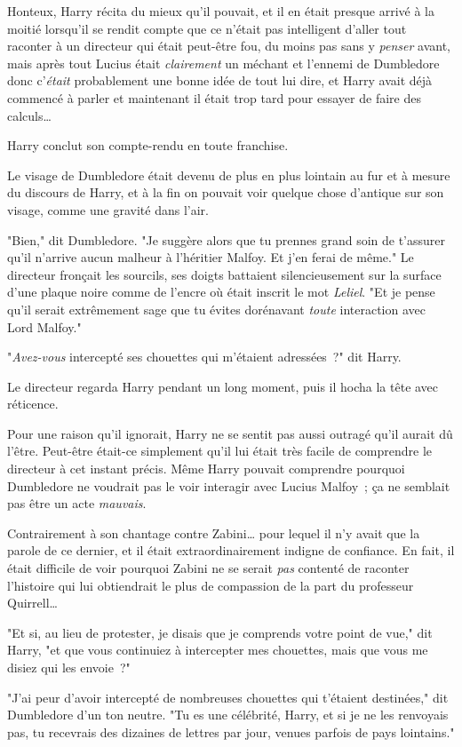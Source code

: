 Honteux, Harry récita du mieux qu'il pouvait, et il en était presque arrivé à la moitié lorsqu'il se rendit compte que ce n'était pas intelligent d'aller tout raconter à un directeur qui était peut-être fou, du moins pas sans y \emph{penser} avant, mais après tout Lucius était \emph{clairement} un méchant et l'ennemi de Dumbledore donc c'\emph{était} probablement une bonne idée de tout lui dire, et Harry avait déjà commencé à parler et maintenant il était trop tard pour essayer de faire des calculs…

Harry conclut son compte-rendu en toute franchise.

Le visage de Dumbledore était devenu de plus en plus lointain au fur et à mesure du discours de Harry, et à la fin on pouvait voir quelque chose d'antique sur son visage, comme une gravité dans l'air.

"Bien," dit Dumbledore. "Je suggère alors que tu prennes grand soin de t'assurer qu'il n'arrive aucun malheur à l'héritier Malfoy. Et j'en ferai de même." Le directeur fronçait les sourcils, ses doigts battaient silencieusement sur la surface d'une plaque noire comme de l'encre où était inscrit le mot \emph{Leliel}. "Et je pense qu'il serait extrêmement sage que tu évites dorénavant \emph{toute} interaction avec Lord Malfoy."

"\emph{Avez-vous} intercepté ses chouettes qui m'étaient adressées~?" dit Harry.

Le directeur regarda Harry pendant un long moment, puis il hocha la tête avec réticence.

Pour une raison qu'il ignorait, Harry ne se sentit pas aussi outragé qu'il aurait dû l'être. Peut-être était-ce simplement qu'il lui était très facile de comprendre le directeur à cet instant précis. Même Harry pouvait comprendre pourquoi Dumbledore ne voudrait pas le voir interagir avec Lucius Malfoy~; ça ne semblait pas être un acte \emph{mauvais}.

Contrairement à son chantage contre Zabini… pour lequel il n'y avait que la parole de ce dernier, et il était extraordinairement indigne de confiance. En fait, il était difficile de voir pourquoi Zabini ne se serait \emph{pas} contenté de raconter l'histoire qui lui obtiendrait le plus de compassion de la part du professeur Quirrell…

"Et si, au lieu de protester, je disais que je comprends votre point de vue," dit Harry, "et que vous continuiez à intercepter mes chouettes, mais que vous me disiez qui les envoie~?"

"J'ai peur d'avoir intercepté de nombreuses chouettes qui t'étaient destinées," dit Dumbledore d'un ton neutre. "Tu es une célébrité, Harry, et si je ne les renvoyais pas, tu recevrais des dizaines de lettres par jour, venues parfois de pays lointains."

